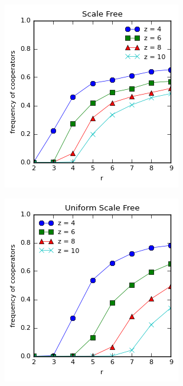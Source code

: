 \documentclass{article}
\begin{document}
	\begin{figure}[h]
		\centering
		\begin{subfigure}[b]{0.4\textwidth}
			\includegraphics[width=\textwidth]{fig/fixed/sfree.png}
			\caption{}
		\end{subfigure}
		\begin{subfigure}[b]{0.4\textwidth}
			\includegraphics[width=\textwidth]{fig/fixed/usfree.png}

\end{subfigure}
\end{figure}
\end{document}
